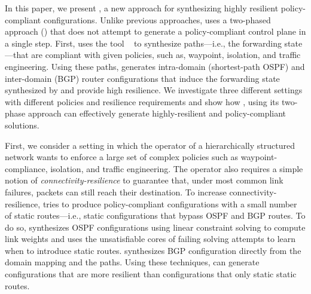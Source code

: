 In this paper, we present \name, a new approach for synthesizing
highly resilient policy-compliant configurations.
Unlike previous approaches, \name uses a two-phased approach 
() 
that does not attempt to generate 
a policy-compliant control plane in a single step.
First, \name 
uses the tool \genesis~\cite{genesis}
to synthesize paths---i.e., the forwarding state---that are compliant
with given policies, such as, waypoint, isolation,
and traffic engineering.
Using these paths, \name generates 
intra-domain (shortest-path OSPF) and inter-domain (BGP) router configurations
that induce the forwarding
state synthesized by \genesis and provide high resilience. 
We investigate three different settings with different policies and resilience requirements
and show how \genesis, using its two-phase approach can effectively generate
highly-resilient and policy-compliant solutions.

First, we consider a setting in which the operator 
of a hierarchically structured network
wants to 
enforce a large set of complex policies such as waypoint-compliance, isolation, and traffic engineering.
The operator also requires a simple notion of \emph{connectivity-resilience} to 
guarantee that, under most common link failures,
packets can still reach their destination.
To increase connectivity-resilience, \name tries to produce policy-compliant configurations with a small number of static routes---i.e., static configurations that bypass OSPF and BGP routes.
To do so, \name synthesizes OSPF configurations using linear constraint solving to compute
link weights and uses the unsatisfiable cores
of failing solving attempts to learn when to introduce static routes.
\name synthesizes BGP configuration directly from the domain mapping and the paths.
Using these techniques, \name can generate configurations that are
 more resilient than configurations that only static static routes.

